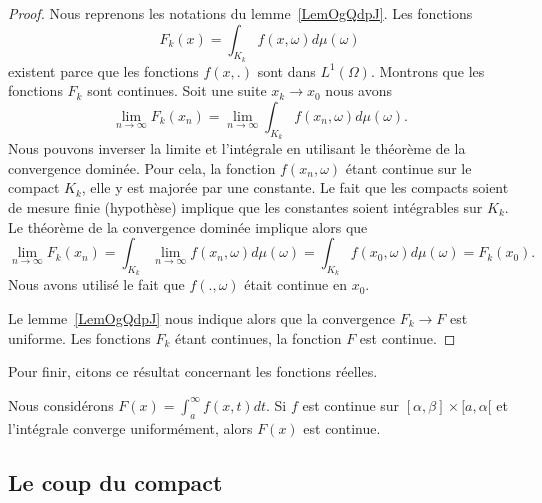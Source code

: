 \begin{proof}
	Nous reprenons les notations du lemme~\ref{LemOgQdpJ}. Les fonctions
	\begin{equation}
		F_k(x)=\int_{K_k}f(x,\omega)d\mu(\omega)
	\end{equation}
	existent parce que les fonctions \( f(x,.)\) sont dans \( L^1(\Omega)\). Montrons que les fonctions \( F_k\) sont continues. Soit une suite \( x_k\to x_0\) nous avons
	\begin{equation}
		\lim_{n\to \infty} F_k(x_n)=\lim_{n\to \infty} \int_{K_k}f(x_n,\omega)d\mu(\omega).
	\end{equation}
	Nous pouvons inverser la limite et l'intégrale en utilisant le théorème de la convergence dominée. Pour cela, la fonction \( f(x_n,\omega)\) étant continue sur le compact \( K_k\), elle y est majorée par une constante. Le fait que les compacts soient de mesure finie (hypothèse) implique que les constantes soient intégrables sur \( K_k\). Le théorème de la convergence dominée implique alors que
	\begin{equation}
		\lim_{n\to \infty} F_k(x_n)=\int_{K_k}\lim_{n\to \infty} f(x_n,\omega)d\mu(\omega)=\int_{K_k}f(x_0,\omega)d\mu(\omega)=F_k(x_0).
	\end{equation}
	Nous avons utilisé le fait que \( f(.,\omega)\) était continue en \( x_0\).

	Le lemme~\ref{LemOgQdpJ} nous indique alors que la convergence \( F_k\to F\) est uniforme. Les fonctions \( F_k\) étant continues, la fonction \( F\) est continue.
\end{proof}

Pour finir, citons ce résultat concernant les fonctions réelles.
\begin{theorem}     \label{ThoInDerrtCvUnifFContinue}
	Nous considérons \( F(x)=\int_a^{\infty}f(x,t)dt\). Si \( f\) est continue sur \( [\alpha,\beta]\times[a,\alpha[\) et l'intégrale converge uniformément, alors \( F(x)\) est continue.
\end{theorem}

\subsection{Le coup du compact}

